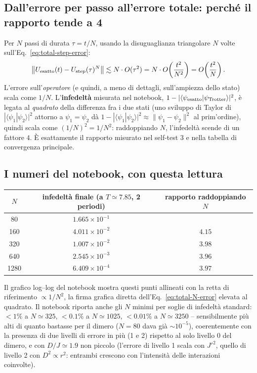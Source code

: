 \documentclass[11pt,a4paper]{article}
\begin{document}
\subsection{Dall'errore per passo all'errore totale: perché il rapporto tende a 4}

Per $N$ passi di durata $\tau=t/N$, usando la disuguaglianza triangolare
$N$ volte sull'Eq.~\eqref{eq:total-step-error}:
\begin{equation}
\big\|U_{\rm esatto}(t)-U_{\rm step}(\tau)^N\big\| \lesssim N\cdot O(\tau^2) = N\cdot O\!\left(\frac{t^2}{N^2}\right) = O\!\left(\frac{t^2}{N}\right).
\label{eq:total-N-error}
\end{equation}
L'errore sull'\emph{operatore} (e quindi, a meno di dettagli, sull'ampiezza
dello stato) scala come $1/N$. L'\textbf{infedeltà} misurata nel notebook,
$1-|\langle\psi_{\rm esatto}|\psi_{\rm Trotter}\rangle|^2$, è legata al
\emph{quadrato} della differenza fra i due stati (uno sviluppo di Taylor
di $|\langle\psi_1|\psi_2\rangle|^2$ attorno a $\psi_1=\psi_2$ dà
$1-|\langle\psi_1|\psi_2\rangle|^2\approx\|\psi_1-\psi_2\|^2$ al
prim'ordine), quindi scala come $(1/N)^2=1/N^2$: raddoppiando $N$,
l'infedeltà scende di un fattore $4$. È esattamente il rapporto misurato
nel self-test 3 e nella tabella di convergenza principale.

\subsection{I numeri del notebook, con questa lettura}

\begin{center}
\begin{tabular}{@{}ccc@{}}
\toprule
$N$ & infedeltà finale (a $T\simeq7.85$, 2 periodi) & rapporto raddoppiando $N$ \\
\midrule
80 & $1.665\times10^{-1}$ & \\
160 & $4.011\times10^{-2}$ & $4.15$ \\
320 & $1.007\times10^{-2}$ & $3.98$ \\
640 & $2.545\times10^{-3}$ & $3.96$ \\
1280 & $6.409\times10^{-4}$ & $3.97$ \\
\bottomrule
\end{tabular}
\end{center}
Il grafico log--log del notebook mostra questi punti allineati con la
retta di riferimento $\propto1/N^2$, la firma grafica diretta
dell'Eq.~\eqref{eq:total-N-error} elevata al quadrato. Il notebook
riporta anche gli $N$ minimi per soglie di infedeltà standard: $<1\%$ a
$N\simeq325$, $<0.1\%$ a $N\simeq1025$, $<0.01\%$ a $N\simeq3250$ --
sensibilmente più alti di quanto bastasse per il dimero ($N=80$ dava già
$\sim10^{-5}$), coerentemente con la presenza di due livelli di errore in
più (1 e 2) rispetto al solo livello 0 del dimero, e con $D/J\simeq1.9$
non piccolo (l'errore di livello 1 scala con $J'^2$, quello di livello 2
con $D^2\propto r^2$: entrambi crescono con l'intensità delle interazioni
coinvolte).
\end{document}
